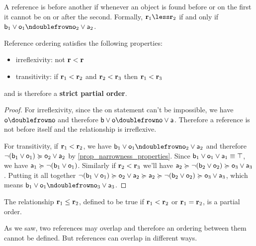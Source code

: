 \documentclass[11pt,letterpaper,fleqn]{memoir} %
\begin{document}
\begin{mathSection}
\begin{defn}
	A reference is before another if whenever an object is found before or on the first it cannot be on or after the second. Formally, $\refStmt_1 \less \refStmt_2$ if and only if $\stmt[b]_1 \OR \stmt[o]_1 \ncomp \stmt[o]_2 \OR \stmt[a]_2$.
\end{defn}
\begin{prop}
	Reference ordering satisfies the following properties:
	\begin{itemize}
		\item irreflexivity: not $\refStmt < \refStmt$
		\item transitivity: if $\refStmt_1 < \refStmt_2$ and $\refStmt_2 < \refStmt_3$ then $\refStmt_1 < \refStmt_3$
	\end{itemize}
	and is therefore a \textbf{strict partial order}.
\end{prop}
\begin{proof}
	For irreflexivity, since the on statement can't be impossible, we have $\stmt[o] \comp \stmt[o]$ and therefore $\stmt[b] \OR \stmt[o] \comp \stmt[o] \OR \stmt[a]$. Therefore a reference is not before itself and the relationship is irreflexive.
	
	For transitivity, if $\refStmt_1 < \refStmt_2$, we have $\stmt[b]_1 \OR \stmt[o]_1 \ncomp \stmt[o]_2 \OR \stmt[a]_2$ and therefore $\NOT (\stmt[b]_1 \OR \stmt[o]_1) \broader \stmt[o]_2 \OR \stmt[a]_2$ by \ref{prop_narrowness_properties}. Since $\stmt[b]_1 \OR \stmt[o]_1 \OR \stmt[a]_1 \equiv \certainty$, we have $\stmt[a]_1 \broader \NOT (\stmt[b]_1 \OR \stmt[o]_1)$. Similarly if $\refStmt_2 < \refStmt_3$ we'll have $\stmt[a]_2 \broader \NOT (\stmt[b]_2 \OR \stmt[o]_2) \broader \stmt[o]_3 \OR \stmt[a]_3$. Putting it all together $\NOT (\stmt[b]_1 \OR \stmt[o]_1) \broader \stmt[o]_2 \OR \stmt[a]_2 \broader \stmt[a]_2 \broader \NOT (\stmt[b]_2 \OR \stmt[o]_2) \broader \stmt[o]_3 \OR \stmt[a]_3$, which means $\stmt[b]_1 \OR \stmt[o]_1 \ncomp \stmt[o]_3 \OR \stmt[a]_3$.
\end{proof}
\begin{coro}
	The relationship $\refStmt_1 \leq \refStmt_2$, defined to be true if $\refStmt_1 < \refStmt_2$ or $\refStmt_1 = \refStmt_2$, is a partial order.
\end{coro}
\end{mathSection}

As we saw, two references may overlap and therefore an ordering between them cannot be defined. But references can overlap in different ways.
\end{document}
